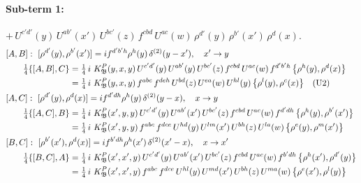\documentclass[10pt]{article}
\numberwithin{equation}{section}
\begin{document}
\paragraph{Sub-term 1:} $+\,U^{c'd'}(y)\,U^{ab'}(x')\,U^{bc'}(z)\,f^{cbd}\,U^{ac}(w)\,\rho^{d'}(y)\,\rho^{b'}(x')\,\rho^{d}(x)$.
\begin{align}
&[A,B]:\ [\rho^{d'}(y),\rho^{b'}(x')]=i f^{d'b'h}\rho^{h}(y)\,\delta^{(2)}(y-x'),\quad x'\to y\notag\\
&\qquad \tfrac14\{[A,B],C\}=\tfrac14\,i\,\,K^{P}_{\mathfrak B}(y,x,y)\,U^{c'd'}(y)\,U^{ab'}(y)\,U^{bc'}(z)\,f^{cbd}\,U^{ac}(w)\,f^{d'b'h}\,\big\{\rho^{h}(y),\rho^{d}(x)\big\}\notag\\
&\qquad\phantom{\tfrac14\{[A,B],C\}}=\tfrac14\,i\,\,K^{P}_{\mathfrak B}(y,x,y)\,f^{abc}\,f^{deh}\,U^{bd}(z)\,U^{ea}(w)\,U^{hl}(y)\,\big\{\rho^{l}(y),\rho^{c}(x)\big\}\quad\text{(U2)}
\label{eq:GIII.II.P-1-AB}\\
&[A,C]:\ [\rho^{d'}(y),\rho^{d}(x)]=i f^{d'dh}\rho^{h}(y)\,\delta^{(2)}(y-x),\quad x\to y\notag\\
&\qquad \tfrac14\{[A,C],B\}=\tfrac14\,i\,\,K^{P}_{\mathfrak B}(x',y,y)\,U^{c'd'}(y)\,U^{ab'}(x')\,U^{bc'}(z)\,f^{cbd}\,U^{ac}(w)\,f^{d'dh}\,\big\{\rho^{h}(y),\rho^{b'}(x')\big\}\notag\\
&\qquad\phantom{\tfrac14\{[A,C],B\}}=\tfrac14\,i\,\,K^{P}_{\mathfrak B}(x',y,y)\,f^{abc}\,f^{dce}\,U^{hd}(y)\,U^{lm}(x')\,U^{bh}(z)\,U^{la}(w)\,\big\{\rho^{e}(y),\rho^{m}(x')\big\}
\label{eq:GIII.II.P-1-AC}\\
&[B,C]:\ [\rho^{b'}(x'),\rho^{d}(x)]=i f^{b'dh}\rho^{h}(x')\,\delta^{(2)}(x'-x),\quad x\to x'\notag\\
&\qquad \tfrac14\{[B,C],A\}=\tfrac14\,i\,\,K^{P}_{\mathfrak B}(x',x',y)\,U^{c'd'}(y)\,U^{ab'}(x')\,U^{bc'}(z)\,f^{cbd}\,U^{ac}(w)\,f^{b'dh}\,\big\{\rho^{h}(x'),\rho^{d'}(y)\big\}\notag\\
&\qquad\phantom{\tfrac14\{[B,C],A\}}=\tfrac14\,i\,\,K^{P}_{\mathfrak B}(x',x',y)\,f^{abc}\,f^{dce}\,U^{hl}(y)\,U^{md}(x')\,U^{bh}(z)\,U^{ma}(w)\,\big\{\rho^{e}(x'),\rho^{l}(y)\big\}
\label{eq:GIII.II.P-1-BC}
\end{align}
\end{document}
